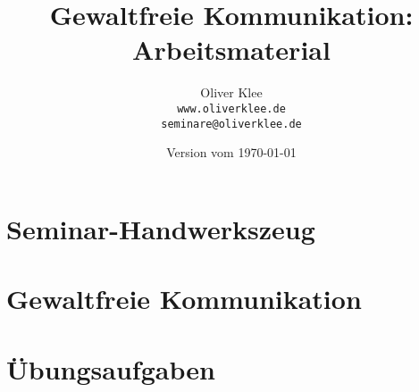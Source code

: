 \documentclass[a4paper,openany,twoside,titlepage,10pt,headsepline]{scrbook}
\title{Gewaltfreie Kommunikation:\\Arbeitsmaterial}
\author{Oliver Klee\\\texttt{www.oliverklee.de}\\\texttt{seminare@oliverklee.de}}
\date{Version vom \today}
\begin{document}
\frontmatter

\maketitle

\tableofcontents


\mainmatter

\chapter{Seminar-Handwerkszeug}


\chapter{Gewaltfreie Kommunikation}








\chapter{Übungsaufgaben}




\backmatter


\end{document}
